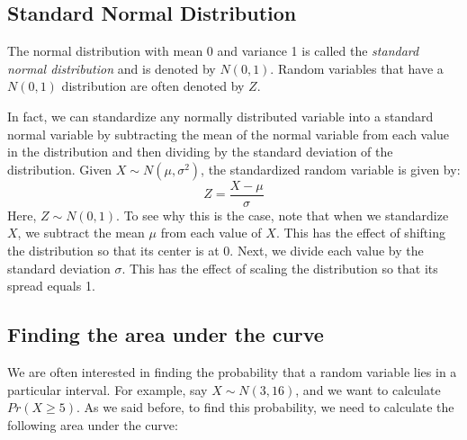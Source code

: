 \documentclass{./../../Latex/handout}
\begin{document}
\subsection{Standard Normal Distribution}
The normal distribution with mean 0 and variance 1 is called the \textit{standard normal distribution} and is denoted by $N(0,1)$. Random variables that have a $N(0,1)$ distribution are often denoted by $Z$. 

In fact, we can standardize any normally distributed variable into a standard normal variable by subtracting the mean of the normal variable from each value in the distribution and then dividing by the standard deviation of the distribution. Given $X \sim N(\mu, \sigma^2)$, the standardized random variable is given by:
$$ Z = \frac{X-\mu}{\sigma} $$
Here, $Z \sim N(0,1)$. To see why this is the case, note that when we standardize $X$, we subtract the mean $\mu$ from each value of $X$. This has the effect of shifting the distribution so that its center is at 0. Next, we divide each value by the standard deviation $\sigma$. This has the effect of scaling the distribution so that its spread equals 1.

\subsection{Finding the area under the curve}

We are often interested in finding the probability that a random variable lies in a particular interval. For example, say $X \sim N(3, 16)$, and we want to calculate $Pr(X \geq 5)$. As we said before, to find this probability, we need to calculate the following area under the curve:\\

 \begin{figure}[!h]
 \centering	
{}
 \end{figure}
\end{document}
